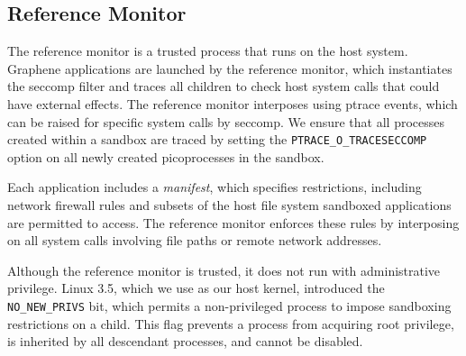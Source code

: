 \subsection{Reference Monitor}
\label{sec:security:monitor}

The reference monitor is a trusted process that runs on the host system.
Graphene applications are launched by the reference monitor,
which instantiates the seccomp filter and traces all children
to check host system calls that could have external effects.
The reference monitor interposes using ptrace events, 
which can be raised for specific system calls by seccomp.
We ensure that all processes created within a sandbox are traced
by setting the {\tt PTRACE\_O\_TRACESECCOMP} option on all newly created picoprocesses
in the sandbox.


Each application includes a {\em manifest}, which specifies restrictions,
including network firewall rules and subsets of the host file system sandboxed
applications are permitted to access.  The reference monitor enforces these
rules by interposing on all system calls involving file paths or remote network addresses.

\vspace{5pt}
Although the reference monitor is trusted, it does not run 
with administrative privilege.
Linux 3.5, which we use as our host kernel, 
introduced the {\tt NO\_NEW\_PRIVS} bit, which permits
a non-privileged process to impose sandboxing restrictions on a child.
This flag prevents a process from acquiring root privilege, %
is inherited by all descendant processes,
and cannot be disabled.

